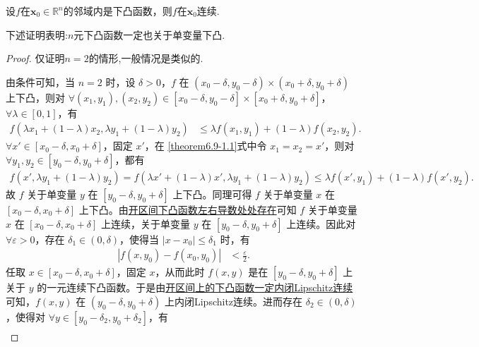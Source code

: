 \documentclass[lang=cn,newtx,10pt,scheme=chinese]{elegantbook}
\begin{document}
\begin{theorem}\label{theorem:邻域上下凸的函数一定在这点连续}
设\(f\)在\(\mathbf{x}_0\in\mathbb{R}^n\)的邻域内是下凸函数，则\(f\)在\(\mathbf{x}_0\)连续.
\end{theorem}
\begin{note}
   下述证明表明:$n$元下凸函数一定也关于单变量下凸.
\end{note}
\begin{proof}
仅证明$n=2$的情形,一般情况是类似的.

由条件可知，当 \(n = 2\) 时，设 \(\delta>0\)，\(f\) 在 \((x_0 - \delta, y_0 - \delta)\times(x_0 + \delta, y_0 + \delta)\) 上下凸，则对 \(\forall (x_1,y_1),(x_2,y_2)\in [x_0 - \delta, y_0 - \delta]\times[x_0 + \delta, y_0 + \delta]\)，\(\forall \lambda\in[0,1]\)，有
\begin{align}
f(\lambda x_1 + (1 - \lambda)x_2,\lambda y_1 + (1 - \lambda)y_2) &\leqslant \lambda f(x_1,y_1)+(1 - \lambda)f(x_2,y_2). \label{theorem6.9-1.1}
\end{align}
\(\forall x'\in [x_0 - \delta, x_0 + \delta]\)，固定 \(x'\)，在 \eqref{theorem6.9-1.1}式中令 \(x_1 = x_2 = x'\)，则对 \(\forall y_1,y_2\in [y_0 - \delta, y_0 + \delta]\)，都有
\begin{align*}
f(x',\lambda y_1 + (1 - \lambda)y_2) = f(\lambda x' + (1 - \lambda)x',\lambda y_1 + (1 - \lambda)y_2) 
\leqslant \lambda f(x',y_1)+(1 - \lambda)f(x',y_2).
\end{align*}
故 \(f\) 关于单变量 \(y\) 在 \([y_0 - \delta, y_0 + \delta]\) 上下凸。同理可得 \(f\) 关于单变量 \(x\) 在 \([x_0 - \delta, x_0 + \delta]\) 上下凸。由\hyperref[theorem:开区间下凸函数左右导数处处存在]{开区间下凸函数左右导数处处存在}可知 \(f\) 关于单变量 \(x\) 在 \([x_0 - \delta, x_0 + \delta]\) 上连续，关于单变量 \(y\) 在 \([y_0 - \delta, y_0 + \delta]\) 上连续。因此对 \(\forall \varepsilon>0\)，存在 \(\delta_1\in(0,\delta)\)，使得当 \(|x - x_0|\leqslant\delta_1\) 时，有
\begin{align}
|f(x,y_0) - f(x_0,y_0)| &< \frac{\varepsilon}{2}. \label{theorem6.9-2.1}
\end{align}
任取 \(x\in [x_0 - \delta, x_0 + \delta]\)，固定 \(x\)，从而此时 \(f(x,y)\) 是在 \([y_0 - \delta, y_0 + \delta]\) 上关于 \(y\) 的一元连续下凸函数。于是由\hyperref[theorem:开区间上的下凸函数一定内闭Lipschitz连续]{开区间上的下凸函数一定内闭Lipschitz连续}可知，\(f(x,y)\) 在 \((y_0 - \delta, y_0 + \delta)\) 上内闭Lipschitz连续。进而存在 \(\delta_2\in(0,\delta)\)，使得对 \(\forall y\in [y_0 - \delta_2, y_0 + \delta_2]\)，有
\begin{align}

\end{align}
\end{proof}
\end{document}
